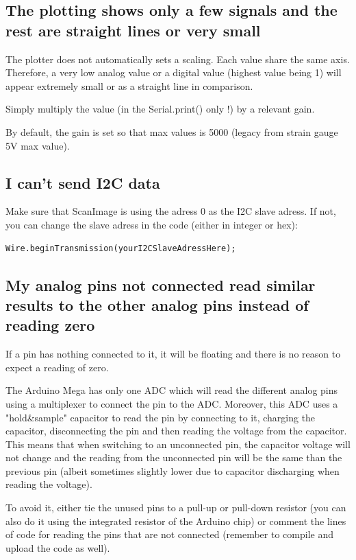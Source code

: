 \documentclass[a4paper]{article}
\begin{document}
\subsection{The plotting shows only a few signals and the rest are straight lines or very small}
The plotter does not automatically sets a scaling. Each value share the same axis. Therefore, a very low analog value or a digital value (highest value being 1) will appear extremely small or as a straight line in comparison.

Simply multiply the value (in the Serial.print() only !) by a relevant gain.

By default, the gain is set so that max values is 5000 (legacy from strain gauge 5V max value).

\subsection{I can't send I2C data}
Make sure that ScanImage is using the adress 0 as the I2C slave adress.
If not, you can change the slave adress in the code (either in integer or hex):
\begin{lstlisting}
Wire.beginTransmission(yourI2CSlaveAdressHere);
\end{lstlisting}


\subsection{My analog pins not connected read similar results to the other analog pins instead of reading zero}
If a pin has nothing connected to it, it will be floating and there is no reason to expect a reading of zero.

The Arduino Mega has only one ADC which will read the different analog pins using a multiplexer to connect the pin to the ADC. Moreover, this ADC uses a "hold\&sample" capacitor to read the pin by connecting to it, charging the capacitor, disconnecting the pin and then reading the voltage from the capacitor.
This means that when switching to an unconnected pin, the capacitor voltage will not change and the reading from the unconnected pin will be the same than the previous pin (albeit sometimes slightly lower due to capacitor discharging when reading the voltage).

To avoid it, either tie the unused pins to a pull-up or pull-down resistor (you can also do it using the integrated resistor of the Arduino chip) or comment the lines of code for reading the pins that are not connected (remember to compile and upload the code as well).\\
\end{document}
